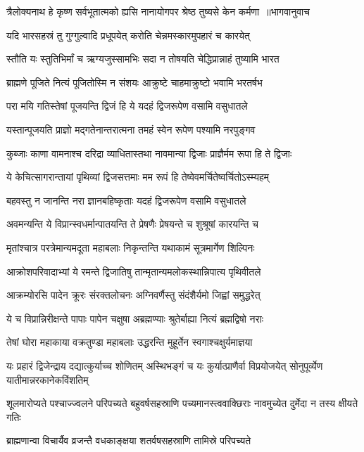 \threelineshloka
{त्रैलोक्यनाथ हे कृष्ण सर्वभूतात्मको ह्यसि}
{नानायोगपर श्रेष्ठ तुष्यसे केन कर्मणा ॥भागवानुवाच}
{}


\twolineshloka
{यदि भारसहस्रं तु गुग्गुल्वादि प्रधूपयेत्}
{करोति चेन्नमस्कारमुपहारं च कारयेत्}


\twolineshloka
{स्तौति यः स्तुतिभिर्मां च ऋग्यजुस्सामभिः सदा}
{न तोषयति चेद्धिप्रान्नाहं तुष्यामि भारत}


\twolineshloka
{ब्राह्मणे पूजिते नित्यं पूजितोस्मि न संशयः}
{आक्रुष्टे चाहमाक्रुष्टो भवामि भरतर्षभ}


\twolineshloka
{परा मयि गतिस्तेषां पूजयन्ति द्विजं हि ये}
{यदहं द्विजरूपेण वसामि वसुधातले}


\twolineshloka
{यस्तान्पूजयति प्राज्ञो मद्गतेनान्तरात्मना}
{तमहं स्वेन रूपेण पश्यामि नरपुङ्गव}


\twolineshloka
{कुब्जाः काणा वामनाश्च दरिद्रा व्याधितास्तथा}
{नावमान्या द्विजाः प्राज्ञैर्मम रूपा हि ते द्विजाः}


\twolineshloka
{ये केचित्सागरान्तायां पृथिव्यां द्विजसत्तमाः}
{मम रूपं हि तेष्वेवमर्चितेष्वर्चितोऽस्म्यहम्}


\twolineshloka
{बहवस्तु न जानन्ति नरा ज्ञानबहिष्कृताः}
{यदहं द्विजरूपेण वसामि वसुधातले}


\twolineshloka
{अवमन्यन्ति ये विप्रान्स्वधर्मान्पातयन्ति ते}
{प्रेषणैः प्रेषयन्ते च शुश्रूषां कारयन्ति च}


\twolineshloka
{मृतांश्चात्र परत्रेमान्यमदूता महाबलाः}
{निकृन्तन्ति यथाकामं सूत्रमार्गेण शिल्पिनः}


\twolineshloka
{आक्रोशपरिवादाभ्यां ये रमन्ते द्विजातिषु}
{तान्मृतान्यमलोकस्थान्निपात्य पृथिवीतले}


\twolineshloka
{आक्रम्योरसि पादेन क्रूरः संरक्तलोचनः}
{अग्निवर्णैस्तु संदंशैर्यमो जिह्वां समुद्धरेत्}


\twolineshloka
{ये च विप्रान्निरीक्षन्ते पापाः पापेन चक्षुषा}
{अब्रह्मण्याः श्रुतेर्बाह्या नित्यं ब्रह्मद्विषो नराः}


\twolineshloka
{तेषां घोरा महाकाया वक्रतुण्डा महाबलाः}
{उद्धरन्ति मुहूर्तेन स्वगाश्चक्षुर्यमाज्ञया}


\threelineshloka
{यः प्रहारं द्विजेन्द्राय दद्यात्कुर्याच्च शोणितम्}
{अस्थिभङ्गं च यः कुर्यात्प्राणैर्वा विप्रयोजयेत्}
{सोनुपूर्व्येण यातीमान्नरकानेकविंशतिम्}


\threelineshloka
{शूलमारोप्यते पश्चाज्ज्वलने परिपच्यते}
{बहुवर्षसहस्राणि पच्यमानस्त्ववाक्छिराः}
{नावमुच्येत दुर्मेदा न तस्य क्षीयते गतिः}


\twolineshloka
{ब्राह्मणान्वा विचार्यैव व्रजन्तै वधकाङ्क्षया}
{शतर्वषसहस्राणि तामिस्रे परिपच्यते}


